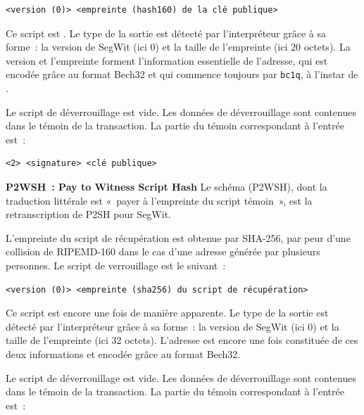 \begin{Verbatim}[fontsize=\footnotesize]
<version (0)> <empreinte (hash160) de la clé publique>
\end{Verbatim}

Ce script est . Le type de la sortie est détecté par l'interpréteur grâce à sa forme~: la version de SegWit (ici 0) et la taille de l'empreinte (ici 20 octets). La version et l'empreinte forment l'information essentielle de l'adresse, qui est encodée grâce au format Bech32 et qui commence toujours par \texttt{bc1q}, à l'instar de .

Le script de déverrouillage est vide. Les données de déverrouillage sont contenues dans le témoin de la transaction. La partie du témoin correspondant à l'entrée est~:

\begin{Verbatim}[fontsize=\footnotesize]
<2> <signature> <clé publique>
\end{Verbatim}

\textbf{P2WSH~: Pay to Witness Script Hash} Le schéma  (P2WSH), dont la traduction littérale est «~payer à l'empreinte du script témoin~», est la retranscription de P2SH pour SegWit.

L'empreinte du script de récupération est obtenue par SHA-256, par peur d'une collision de RIPEMD-160 dans le cas d'une adresse générée par plusieurs personnes. Le script de verrouillage est le suivant~:

\begin{Verbatim}[fontsize=\footnotesize]
<version (0)> <empreinte (sha256) du script de récupération>
\end{Verbatim}

Ce script est encore une fois  de manière apparente. Le type de la sortie est détecté par l'interpréteur grâce à sa forme~: la version de SegWit (ici 0) et la taille de l'empreinte (ici 32 octets). L'adresse est encore une fois constituée de ces deux informations et encodée grâce au format Bech32.

Le script de déverrouillage est vide. Les données de déverrouillage sont contenues dans le témoin de la transaction. La partie du témoin correspondant à l'entrée est~:

